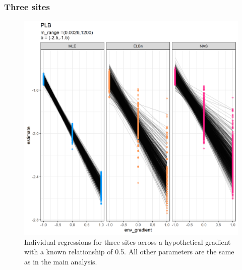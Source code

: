 \documentclass[
]{article}
\begin{document}
\newpage

\hypertarget{three-sites}{%
\subsubsection{Three sites}\label{three-sites}}

\begin{figure}
\centering
\includegraphics{figures/PLB_3_sites_main.png}
\caption{Individual regressions for three sites across a hypothetical
gradient with a known relationship of 0.5. All other parameters are the
same as in the main analysis.}
\end{figure}

\newpage
\end{document}
